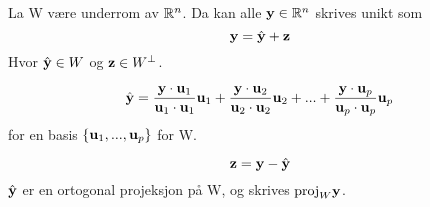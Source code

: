 La W være underrom av $\mathbb{R}^n$.
Da kan alle $\mathbf{y}\in\mathbb{R}^n$ skrives unikt som
$$\mathbf{y} = \hat{\mathbf{y}} + \mathbf{z}$$
Hvor $\hat{\mathbf{y}}\in W$ og $\mathbf{z}\in W^\perp$.

$$\hat{\mathbf{y}} = \frac{\mathbf{y}\cdot\mathbf{u}_1}{\mathbf{u}_1\cdot\mathbf{u}_1}\mathbf{u}_1
                + \frac{\mathbf{y}\cdot\mathbf{u}_2}{\mathbf{u}_2\cdot\mathbf{u}_2}\mathbf{u}_2
                + ...
                + \frac{\mathbf{y}\cdot\mathbf{u}_p}{\mathbf{u}_p\cdot\mathbf{u}_p}\mathbf{u}_p$$
for en basis $\{ \mathbf{u}_1, ..., \mathbf{u}_p \}$ for W.

$$\mathbf{z} = \mathbf{y} - \hat{\mathbf{y}}$$
$\hat{\mathbf{y}}$ er en ortogonal projeksjon på W,
og skrives $\text{proj}_W\mathbf{y}$.
